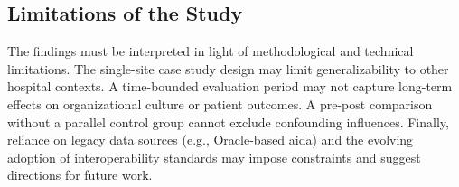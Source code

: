 \subsection{Limitations of the Study}
The findings must be interpreted in light of methodological and technical limitations. The single-site case study design may limit generalizability to other hospital contexts. A time-bounded evaluation period may not capture long-term effects on organizational culture or patient outcomes. A pre-post comparison without a parallel control group cannot exclude confounding influences. Finally, reliance on legacy data sources (e.g., Oracle-based \gls{aida}) and the evolving adoption of interoperability standards may impose constraints and suggest directions for future work.


